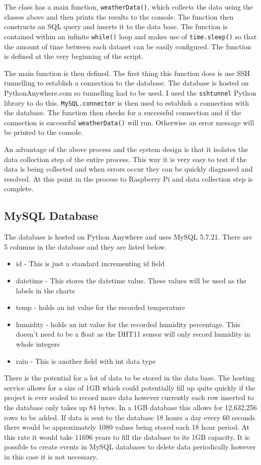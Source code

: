 \documentclass[10pt,a4paper]{article}
\begin{document}
The class has a main function, \texttt{weatherData()}, which collects the data using the classes above and then prints the results to the console. The function then constructs an SQL query and inserts it to the data base. The function is contained within an infinite \texttt{while()} loop and makes use of  \texttt{time.sleep()} so that the amount of time between each dataset can be easily configured. The function is defined at the very beginning of the script. 

The main function is then defined. The first thing this function does is use SSH tunnelling to establish a connection to the database. The database is hosted on PythonAnywhere.com so tunnelling had to be used. I used the \texttt{sshtunnel} Python library to do this. \texttt{MySQL.connector} is then used to establish a connection with the database. The function then checks for a successful connection and if the connection is successful \texttt{weatherData()} will run. Otherwise an error message will be printed to the console. 

An advantage of the above process and the system design is that it isolates the data collection step of the entire process. This way it is very easy to test if the data is being collected and when errors occur they can be quickly diagnosed and resolved. At this point in the process to Raspberry Pi and data collection step is complete. 

\subsection{MySQL Database}
The database is hosted on Python Anywhere and uses MySQL 5.7.21. There are 5 columns in the database and they are listed below. 
\begin{itemize}
\item id - This is just a standard incrementing id field
\item datetime - This stores the datetime value. These values will be used as the labels in the charts
\item temp - holds an int value for the recorded temperature
\item humidity - holds an int value for the recorded humidity percentage. This doesn't need to be a float as the DHT11 sensor will only record humidity in whole integers
\item rain - This is another field with int data type
\end{itemize}

There is the potential for a lot of data to be stored in the data base. The hosting service allows for a size of 1GB which could potentially fill up quite quickly if the project is ever scaled to record more data however currently each row inserted to the database only takes up 84 bytes. In a 1GB database this allows for 12,632,256 rows to be added. If data is sent to the database 18 hours a day every 60 seconds there would be approximately 1080 values being stored each 18 hour period. At this rate it would take 11696 years to fill the database to its 1GB capacity. It is possible to create events in MySQL databases to delete data periodically however in this case it is not necessary. 
\end{document}
